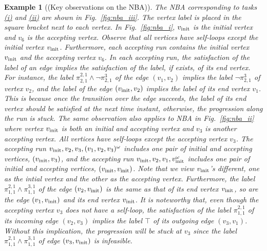 \documentclass[Afour,sageh,times]{sagej}
\newtheorem{exmp}{Example}
\newcommand{\vertex}[1]{v_{\textup{#1}}}
\renewcommand{\ap}[3]{\mathcal{\pi}_{{#1},{#2}}^{#3}}
\newenvironment{cexmp}
{\addtocounter{exmp}{-1}\begin{exmp}}
  {\end{exmp}}
\begin{document}
 \begin{cexmp}[(Key observations on the NBA)]
   The NBA corresponding to tasks \hyperref[task:i]{\it (i)} and \hyperref[task:i]{\it (ii)} are shown in Fig.~\ref{fig:nba_iii}. The vertex label is placed in the square bracket next to each vertex. In Fig.~\ref{fig:nba_i}, $\vertex{init}$ is the initial vertex and $v_6$ is the accepting vertex. Observe that all vertices have self-loops except the initial vertex $\vertex{init}$. Furthermore, each accepting run contains the initial vertex $\vertex{init}$ and the accepting vertex $v_6$. In each accepting run, the satisfaction of the label of an edge implies the satisfaction of the label, if exists, of its end vertex. For instance, the label $\ap{2}{1}{2,1} \wedge \neg\ap{2}{1}{3}$ of the edge $(v_1, v_2)$ implies the label $\neg\ap{2}{1}{3}$ of vertex $v_2$, and  the label of the edge  $(\vertex{init}, v_2)$ implies the label of  its end vertex $v_1$. This is because once the transition over the edge succeeds, the label of its end vertex should be satisfied at the next time instant, otherwise, the progression along the run is stuck.
   The same observation also applies to NBA in Fig.~\ref{fig:nba_ii} where vertex $\vertex{init}$ is both an initial and accepting vertex and $v_3$ is another accepting vertex. All vertices have self-loops except the accepting vertex $v_3$. The accepting run $\vertex{init}, v_2, v_3, (v_1, v_2, v_3)^\omega$ includes one pair of initial and accepting vertices, $(\vertex{init}, v_3)$, and the accepting run $\vertex{init}, v_2, v_1, \vertex{init}^\omega$ includes one pair of initial and accepting vertices, $(\vertex{init}, \vertex{init})$. Note that we view $\vertex{init}$'s different, one as the intial vertex and the other as the accepting vertex. Furthermore, the label $\ap{1}{1}{2,1}\wedge \ap{1}{1}{3,1}$ of the edge $(v_2, \vertex{init})$ is the same as that of its end vertex $\vertex{init}$, so are the edge $(v_1, \vertex{init})$ and its end vertex $\vertex{init}$. It is noteworthy that, even though the accepting vertex $v_3$ does not have a self-loop, the satisfaction of the label $\ap{1}{1}{2,1}$ of its incoming edge $(v_2, v_3)$ implies the label $\top$ of its outgoing edge $(v_3, v_1)$. Without this implication, the progression will be stuck at $v_3$ since the label $\ap{1}{1}{2,1} \wedge \ap{1}{1}{3,1}$ of edge $(v_3, \vertex{init})$ is infeasible.
 \end{cexmp}
\end{document}
